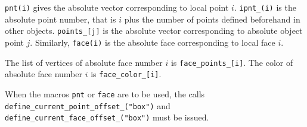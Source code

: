 \documentclass[nonumber,harvardcite]{ltugboat}
\begin{document}
\verb|pnt(i)| gives the absolute vector corresponding to local point $i$.
\verb|ipnt_(i)| is the absolute point number, that is $i$ plus the number
of points defined beforehand in other objects.
\verb|points_[j]| is the absolute vector corresponding to absolute object
point $j$. Similarly, \verb|face(i)| 
is the absolute face corresponding to local face $i$.

The list of vertices of absolute face number $i$ is \verb|face_points_[i]|.
The color of absolute face number $i$ is \verb|face_color_[i]|.


When the macros \verb|pnt| or \verb|face| are to be used, the calls
\verb|define_current_point_offset_("box")| and
\verb|define_current_face_offset_("box")| must be issued.


\makesignature
\end{document}
